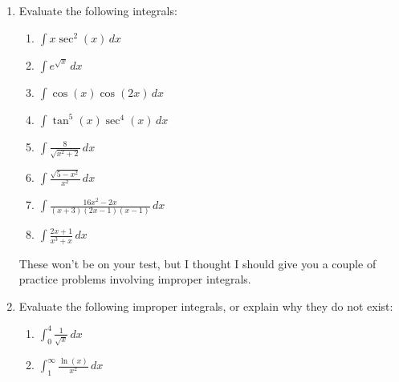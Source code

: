\documentclass[12pt]{article}
\newcommand{\di}{\displaystyle}
\begin{document}
\begin{enumerate}
\newpage

\item Evaluate the following integrals:
\begin{enumerate}
 \item $\di \int x\sec^2(x)\,dx$

\vspace{1.8in}

 \item $\di \int e^{\sqrt{x}}\,dx$

\vspace{1.8in}

 \item $\di \int \cos(x)\cos(2x)\,dx$

\vspace{1.8in}

 \item $\di \int \tan^5(x)\sec^4(x)\,dx$

\vspace{2in}

 \item $\di \int \frac{8}{\sqrt{x^2+2}}\,dx$

\vspace{2in}

 \item $\di \int \frac{\sqrt{5-x^2}}{x^2}\,dx$

\vspace{2in}

 \item $\di \int \frac{16x^2-2x}{(x+3)(2x-1)(x-1)}\,dx$

\vspace{2in}

 \item $\di \int \frac{2x+1}{x^3+x}\,dx$

\vspace{2in}

\end{enumerate}
\newpage

These won't be on your test, but I thought I should give you a couple of practice problems involving improper integrals.

\bigskip


\item Evaluate the following improper integrals, or explain why they do not exist:
\begin{enumerate}
 \item $\di \int_0^4\frac{1}{\sqrt{x}}\,dx$

\vspace{4in}

 \item $\di \int_1^\infty \frac{\ln(x)}{x^2}\,dx$
\end{enumerate}

\end{enumerate}
\end{document}
